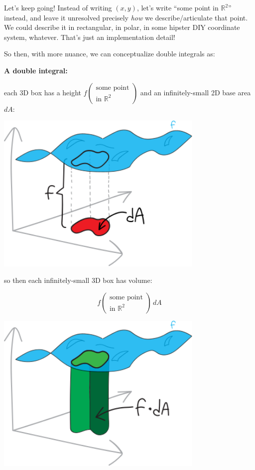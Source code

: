 \documentclass[
]{article}
\begin{document}
Let's keep going! Instead of writing \((x,y)\), let's write ``some point in \(\mathbb{R}^2\)'' instead, and leave it unresolved precisely \emph{how} we describe/articulate that point. We could describe it in rectangular, in polar, in some hipster DIY coordinate system, whatever. That's just an implementation detail!

So then, with more nuance, we can conceptualize double integrals as:

\textbf{A double integral:}

each 3D box has a height \(f\left(\substack{\text{some point}\\\text{in }\mathbb{R}^2}\right)\) and an infinitely-small 2D base area \(dA\):

\includegraphics[width=0.75\textwidth,height=\textheight]{3d-integral-2-1.svg}

so then each infinitely-small 3D box has volume:

\[ f\left(\substack{\text{some point}\\\text{in }\mathbb{R}^2}\right)\,dA \]

\includegraphics[width=0.75\textwidth,height=\textheight]{3d-integral-2-2.svg}
\end{document}

